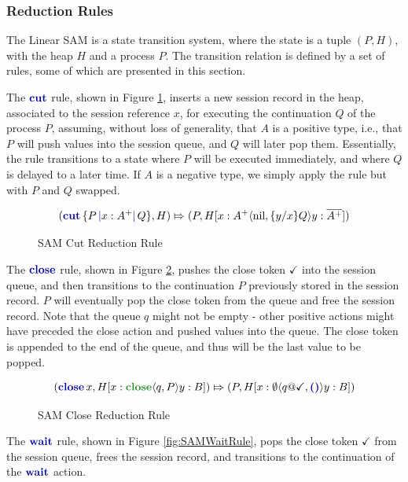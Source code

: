 \subsubsection{Reduction Rules}

The Linear SAM is a state transition system, where the state is a tuple $(P, H)$, with the heap $H$ and a process $P$. The transition relation is defined by a set of rules, some of which are presented in this section.

The $\cutp$ rule, shown in Figure \ref{fig:SAMCutRule}, inserts a new session record in the heap, associated to the session reference $x$, for executing the continuation $Q$ of the process $P$, assuming, without loss of generality, that $A$ is a positive type, i.e., that $P$ will push values into the session queue, and $Q$ will later pop them. Essentially, the rule transitions to a state where $P$ will be executed immediately, and where $Q$ is delayed to a later time. If $A$ is a negative type, we simply apply the rule but with $P$ and $Q$ swapped.

\begin{figure}[H]
    \centering
    $$
        (\cutc{P}{x: A^+}{Q}, H)
        \Mapsto
        (P, H[x: A^+\langle\text{nil},\{y/x\}Q\rangle y:\dual{A^+}])
    $$
    \caption{SAM Cut Reduction Rule}
    \label{fig:SAMCutRule}
\end{figure}

The $\closep$ rule, shown in Figure \ref{fig:SAMCloseRule}, pushes the close token $\checkmark$ into the session queue, and then transitions to the continuation $P$ previously stored in the session record. $P$ will eventually pop the close token from the queue and free the session record. Note that the queue $q$ might not be empty - other positive actions might have preceded the close action and pushed values into the queue. The close token is appended to the end of the queue, and thus will be the last value to be popped.

\begin{figure}[H]
    \centering
    $$
        (\closec{x}, H[x:\closet\langle q, P\rangle y:B])
        \Mapsto
        (P,H[x:\emptyset\langle q@\checkmark, \emptyp\rangle y:B])
    $$
    \caption{SAM Close Reduction Rule}
    \label{fig:SAMCloseRule}
\end{figure}

The $\waitp$ rule, shown in Figure \ref{fig:SAMWaitRule}, pops the close token $\checkmark$ from the session queue, frees the session record, and transitions to the continuation of the $\waitp$ action.


